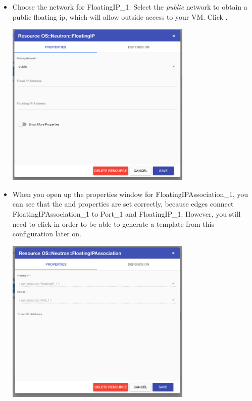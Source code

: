 \begin{enumerate}
\begin{itemize}
\begin{center}
    \end{center}
  \item Choose the network for FloatingIP\_1.  Select the \emph{public}
    network to obtain a public floating ip, which will allow outside
    access to your VM.  Click .
    \begin{center}
      \includegraphics[width=0.7\textwidth]{img/floatingip_properties}
    \end{center}
  \item When you open up the properties window for
    FloatingIPAssociation\_1, you can see that the  and  properties are set correctly, because
    edges connect FloatingIPAssociation\_1 to Port\_1 and
    FloatingIP\_1.  However, you still need to click
     in order to be able to generate a template
    from this configuration later on.
    \begin{center}
      \includegraphics[width=0.7\textwidth]{img/floatingipassociation_properties}

\end{center}
\end{itemize}
\end{enumerate}
